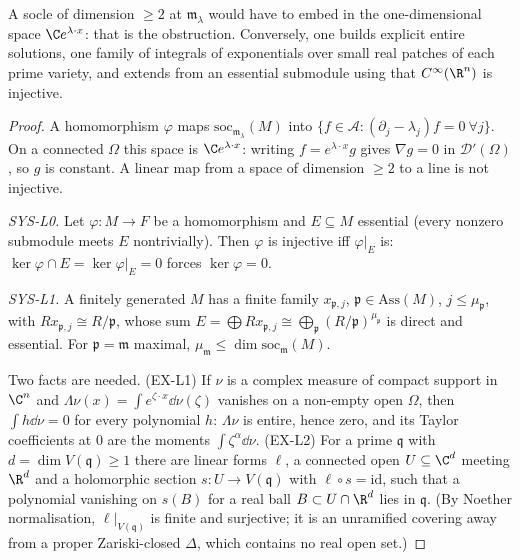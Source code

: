\begin{proofidea}
A socle of dimension $\ge2$ at $\mathfrak m_\lambda$ would have to embed in the one-dimensional space $\C e^{\lambda\cdot x}$: that is the obstruction. Conversely, one builds explicit entire solutions, one family of integrals of exponentials over small real patches of each prime variety, and extends from an essential submodule using that $C^\infty(\R^n)$ is injective.
\end{proofidea}

\begin{proof}
A homomorphism $\varphi$ maps $\mathrm{soc}_{\mathfrak m_\lambda}(M)$ into $\{f\in\mathcal A:(\partial_j-\lambda_j)f=0\ \forall j\}$. On a connected $\Omega$ this space is $\C e^{\lambda\cdot x}$: writing $f=e^{\lambda\cdot x}g$ gives $\nabla g=0$ in $\mathcal D'(\Omega)$, so $g$ is constant. A linear map from a space of dimension $\ge2$ to a line is not injective.

\emph{SYS-L0.} Let $\varphi:M\to F$ be a homomorphism and $E\subseteq M$ essential (every nonzero submodule meets $E$ nontrivially). Then $\varphi$ is injective iff $\varphi|_E$ is: $\ker\varphi\cap E=\ker\varphi|_E=0$ forces $\ker\varphi=0$.

\emph{SYS-L1.} A finitely generated $M$ has a finite family $x_{\mathfrak p,j}$, $\mathfrak p\in\mathrm{Ass}(M)$, $j\le\mu_{\mathfrak p}$, with $Rx_{\mathfrak p,j}\cong R/\mathfrak p$, whose sum $E=\bigoplus Rx_{\mathfrak p,j}\cong\bigoplus_{\mathfrak p}(R/\mathfrak p)^{\mu_{\mathfrak p}}$ is direct and essential. For $\mathfrak p=\mathfrak m$ maximal, $\mu_{\mathfrak m}\le\dim\mathrm{soc}_{\mathfrak m}(M)$.

Two facts are needed. (EX-L1) If $\nu$ is a complex measure of compact support in $\C^n$ and $\Lambda\nu(x)=\int e^{\zeta\cdot x}\dd\nu(\zeta)$ vanishes on a non-empty open $\Omega$, then $\int h\dd\nu=0$ for every polynomial $h$: $\Lambda\nu$ is entire, hence zero, and its Taylor coefficients at $0$ are the moments $\int\zeta^\alpha\dd\nu$. (EX-L2) For a prime $\mathfrak q$ with $d=\dim V(\mathfrak q)\ge1$ there are linear forms $\ell$, a connected open $U\subseteq\C^d$ meeting $\R^d$ and a holomorphic section $s:U\to V(\mathfrak q)$ with $\ell\circ s=\mathrm{id}$, such that a polynomial vanishing on $s(B)$ for a real ball $B\subset U\cap\R^d$ lies in $\mathfrak q$. (By Noether normalisation, $\ell|_{V(\mathfrak q)}$ is finite and surjective; it is an unramified covering away from a proper Zariski-closed $\Delta$, which contains no real open set.)


\end{proof}
